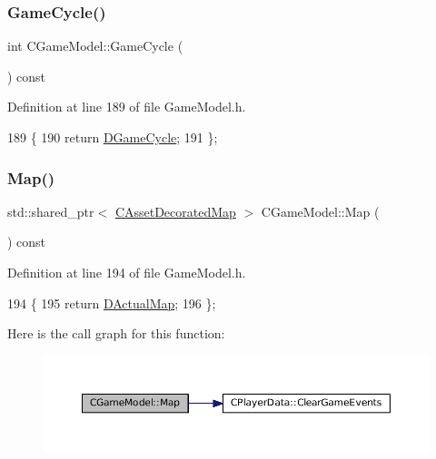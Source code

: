 \subsubsection{\texorpdfstring{Game\+Cycle()}{GameCycle()}}
{\footnotesize\ttfamily int C\+Game\+Model\+::\+Game\+Cycle (\begin{DoxyParamCaption}{ }\end{DoxyParamCaption}) const\hspace{0.3cm}{\ttfamily [inline]}}



Definition at line 189 of file Game\+Model.\+h.


\begin{DoxyCode}
189                              \{
190             \textcolor{keywordflow}{return} \hyperlink{classCGameModel_a80bf86a6c1d75229d5d0f441f6313a1c}{DGameCycle};
191         \};
\end{DoxyCode}
\hypertarget{classCGameModel_a7b95d8fb5d96d3dd9ad3596e1a90f6a3}{}\label{classCGameModel_a7b95d8fb5d96d3dd9ad3596e1a90f6a3} 
\subsubsection{\texorpdfstring{Map()}{Map()}}
{\footnotesize\ttfamily std\+::shared\+\_\+ptr$<$ \hyperlink{classCAssetDecoratedMap}{C\+Asset\+Decorated\+Map} $>$ C\+Game\+Model\+::\+Map (\begin{DoxyParamCaption}{ }\end{DoxyParamCaption}) const\hspace{0.3cm}{\ttfamily [inline]}}



Definition at line 194 of file Game\+Model.\+h.


\begin{DoxyCode}
194                                                        \{
195             \textcolor{keywordflow}{return} \hyperlink{classCGameModel_ace04c3b62d6b71e20d1ed5460c0c3cee}{DActualMap};  
196         \};
\end{DoxyCode}
Here is the call graph for this function\+:
\nopagebreak
\begin{figure}[H]
\begin{center}
\leavevmode
\includegraphics[width=350pt]{classCGameModel_a7b95d8fb5d96d3dd9ad3596e1a90f6a3_cgraph}
\end{center}
\end{figure}
\hypertarget{classCGameModel_ad9c8def41d5369661fab971b9a4fe786}{}\label{classCGameModel_ad9c8def41d5369661fab971b9a4fe786} 
